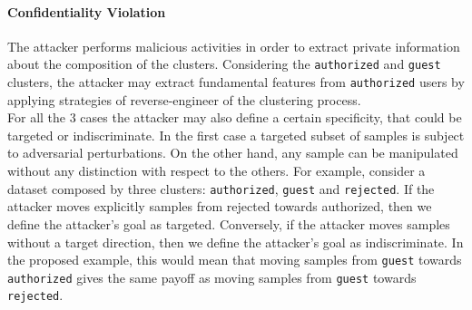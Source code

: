 \paragraph{Confidentiality Violation} The attacker performs malicious activities in order to extract private information about the composition of the clusters. Considering the \texttt{authorized} and \texttt{guest} clusters, the attacker may extract fundamental features from \texttt{authorized} users by applying strategies of reverse-engineer of the clustering process.\\


For all the 3 cases the attacker may also define a certain specificity, that could be targeted or indiscriminate. In the first case a targeted subset of samples is subject to adversarial perturbations. On the other hand, any sample can be manipulated without any distinction with respect to the others. For example, consider a dataset composed by three clusters: \texttt{authorized}, \texttt{guest} and \texttt{rejected}. If the attacker moves explicitly samples from rejected towards authorized, then we define the attacker's goal as targeted. Conversely, if the attacker moves samples without a target direction, then we define the attacker's goal as indiscriminate. In the proposed example, this would mean that moving samples from \texttt{guest} towards \texttt{authorized} gives the same payoff as moving samples from \texttt{guest} towards \texttt{rejected}.


